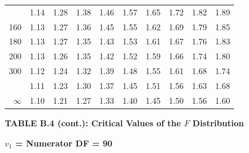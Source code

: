 \documentclass[10pt]{article}
\begin{document}
\begin{longtable}{@{}r!{\vrule width 0.8pt\hspace{0.55em}}rrrrrrrrr@{}}
 & 1.14 & 1.28 & 1.38 & 1.46 & 1.57 & 1.65 & 1.72 & 1.82 & 1.89 \\
160 & 1.13 & 1.27 & 1.36 & 1.45 & 1.55 & 1.62 & 1.69 & 1.79 & 1.85 \\
180 & 1.13 & 1.27 & 1.35 & 1.43 & 1.53 & 1.61 & 1.67 & 1.76 & 1.83 \\
200 & 1.13 & 1.26 & 1.35 & 1.42 & 1.52 & 1.59 & 1.66 & 1.74 & 1.80 \\
300 & 1.12 & 1.24 & 1.32 & 1.39 & 1.48 & 1.55 & 1.61 & 1.68 & 1.74 \\
 & 1.11 & 1.23 & 1.30 & 1.37 & 1.45 & 1.51 & 1.56 & 1.63 & 1.68 \\
$\infty$ & 1.10 & 1.21 & 1.27 & 1.33 & 1.40 & 1.45 & 1.50 & 1.56 & 1.60 \\
\end{longtable}
\newpage
\thispagestyle{empty}
\begin{center}
{\large\bfseries TABLE B.4 (cont.): Critical Values of the $F$ Distribution\par}
\end{center}
{\large\bfseries $v_1$ = Numerator DF = 90\par}
\vspace{0.5em}
\small
\end{document}
